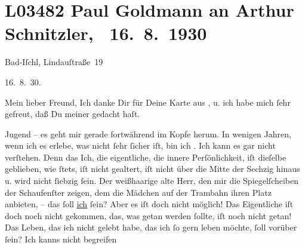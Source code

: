 

\section[ Paul Goldmann an Arthur Schnitzler, 16. 8. 1930]{L03482 Paul Goldmann an Arthur Schnitzler,  16. 8. 1930}
\nopagebreak{}
\rehead{ }\normalsize\beginnumbering{}
\toendnotes[C]{\smallbreak\pagebreak[2]}
\toendnotes[C]{\smallbreak}
\toendnotes[C]{\smallbreak}
\pstart
           {\pb}Bad-Iſchl, Lindauſtraße 19\pend
           
\pstart
           \raggedleft{}16. 8. 30.\pend
           
\pstart{}Mein lieber Freund,\pend\vspace{0.5em}
\pstart
           Ich danke Dir für Deine Karte aus \label{K_L03482-1v}\label{K_L03482-1}, u. ich habe mich{ }ſehr gefreut, daß Du meiner gedacht haſt.\pend
           
\pstart
           Jugend – es geht mir gerade fortwährend im Kopfe herum. In wenigen Jahren,  wenn ich es erlebe, was nicht{ }ſehr{ }ſicher iſt, bin
               ich \label{K_L03482-2v}\label{K_L03482-2}. Ich kann es gar nicht verſtehen. Denn das
               Ich, die eigentliche, die innere Perſönlichkeit, iſt dieſelbe geblieben, wie{ }ſtets,
               iſt nicht gealtert, {\pb}iſt nicht über die Mitte
               der Sechzig hinaus u. wird nicht{ }ſiebzig{ }ſein. Der weißhaarige alte Herr, den mir die
               Spiegelſcheiben der Schaufenſter zeigen, dem die Mädchen auf der Trambahn ihren Platz
               anbieten, – das{ }ſoll \uline{ich}{ }ſein? Aber es iſt doch nicht
               möglich! Das Eigentliche iſt doch noch nicht gekommen, das, was getan werden{ }ſollte,
               iſt noch nicht getan! Das Leben, das ich nicht gelebt habe, das ich{ }ſo gern leben
               möchte,{ }ſoll vorüber{ }ſein? Ich kanns nicht begreifen{\dotsfive}\pend
           
